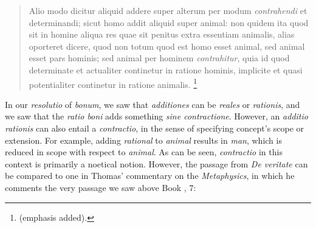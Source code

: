 \begin{quotation}
Alio modo dicitur aliquid addere super alterum per modum \emph{contrahendi} et determinandi; sicut homo addit aliquid super animal: non quidem ita quod sit in homine aliqua res quae sit penitus extra essentiam animalis, alias oporteret dicere, quod non totum quod est homo esset animal, sed animal esset pars hominis; sed animal per hominem \emph{contrahitur}, quia id quod determinate et actualiter continetur in ratione hominis, implicite et quasi potentialiter continetur in ratione animalis.%
%
\footnote{\cite[q.~21, a.~1, co.]{st:deveritate} (emphasis added).}
\end{quotation}
%
In our \emph{resolutio} of \emph{bonum}, we saw that \emph{additiones} can be \emph{reales} or \emph{rationis}, and we saw that the \emph{ratio boni} adds something \emph{sine contractione}. However, an \emph{additio rationis} can also entail a \emph{contractio}, in the sense of specifying concept's scope or extension. For example, adding \emph{rational} to \emph{animal} results in \emph{man}, which is reduced in scope with respect to \emph{animal}. As can be seen, \emph{contractio} in this context is primarily a noetical notion. However, the passage from \emph{De veritate} can be compared to one in Thomas' commentary on the \emph{Metaphysics}, in which he comments the very passage we saw above Book , 7:

